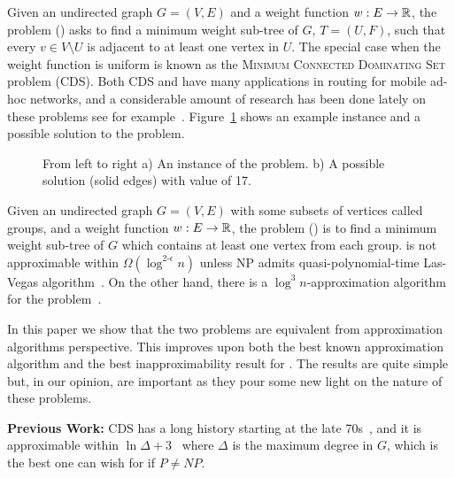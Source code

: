 Given an undirected graph $G = (V, E)$ and a weight function $w:E \to \mathbb{R}$, 
the \Problem{} problem (\Prob{}) asks to find a minimum weight sub-tree of $G$, 
$T = (U, F)$, such that every $v \in V \setminus U$ is adjacent to at least one 
vertex in $U$.
The special case when the weight function is uniform is known as the 
\textsc{Minimum Connected Dominating Set} problem (CDS). 
Both CDS and \Prob{} have many applications in routing
for mobile ad-hoc networks, 
and a considerable amount of research has been done lately on these problems
see for example~\cite{%
shin2010approximation%
,cheng2003polynomial%
,das1997routing%
,adasme2016models%
,adasme2017minimum%
,rossi2018properties%
,adasme2018improved%
,alvarez2018exact%
,dravzic2017metaheuristic%
,shi2011dominating%
}.
Figure~\ref{fig:problem} shows an example instance and a possible solution to the problem. 

\begin{figure}[h]
\begin{center}
\scalebox{.8}{

}
\end{center}
\caption{\label{fig:problem}
From left to right
a) An instance of the \Problem{} problem.
b) A possible solution (solid edges) with value of 17.
}
\end{figure}

Given an undirected graph $G = (V, E)$ with some subsets of vertices called groups,
and a weight function $w:E \to \mathbb{R}$,
the \ProblemGroup{} problem (\ProbGroup{}) is to find a minimum weight sub-tree
of $G$ which contains at least one vertex from each group.
\ProbGroup{} is not approximable within $ \Omega(\log^{2\textbf{-}\epsilon}n)$
unless NP admits quasi-polynomial-time Las-Vegas
algorithm~\cite{halperin2003polylogarithmic}.
On the other hand, there is a $\log^3 n$-approximation algorithm for the 
problem~\cite{garg2000polylogarithmic}.

In this paper we show that the two problems are equivalent 
from approximation algorithms perspective.
This improves upon both the best known approximation algorithm and the best 
inapproximability result for \Prob{}.
The results are quite simple but, in our opinion, 
are important as they pour some new light on the nature of these problems.
 
\textbf{Previous Work:}
CDS has a long history starting at the late 70s~\cite{sampathkumar1979connected},
and it is approximable within $\ln\Delta + 3$~\cite{guha1998approximation} 
where $\Delta$ is the maximum degree in $G$,
which is the best one can wish for if $P \neq NP$. 

